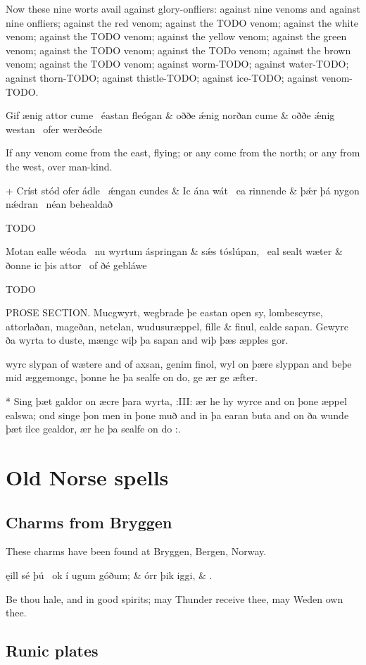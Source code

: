 \bvb Now these nine worts avail against glory-onfliers: against nine venoms and against nine onfliers; against the red venom; against the TODO venom; against the white venom; against the TODO venom; against the yellow venom; against the green venom; against the TODO venom; against the TODo venom; against the brown venom; against the TODO venom; against worm-TODO; against water-TODO; against thorn-TODO; against thistle-TODO; against ice-TODO; against venom-TODO.\evb
\evg


\bvg{}
\bva[0]Gif ænig attor cume \hld\ éastan fleógan &
oððe ǽnig norðan cume &
oððe ǽnig westan \hld\ ofer werðeóde\eva

\bvb If any venom come from the east, flying; or any come from the north; or any from the west, over man-kind.\evb
\evg


\bvg{}
\bva[0]+ Críst stód ofer ádle \hld\ ǽngan cundes &
Ic ána wát \hld\ ea rinnende &
þǽr þá nygon nǽdran \hld\ néan behealdað\eva

\bvb TODO\evb
\evg


\bvg{}
\bva[0]Motan ealle wéoda \hld\ nu wyrtum áspringan &
sǽs tóslúpan, \hld\ eal sealt wæter &
ðonne ic þis attor \hld\ of ðé gebláwe\eva

\bvb TODO\evb
\evg


PROSE SECTION.
Mucgwyrt, wegbrade þe eastan open sy, lombescyrse, attorlaðan, mageðan, netelan, wudusuræppel, fille \& finul, ealde sapan. Gewyrc ða wyrta to duste, mængc wiþ þa sapan and wiþ þæs æpples gor.

wyrc slypan of wætere and of axsan, genim finol, wyl on þære slyppan and beþe mid æggemongc, þonne he þa sealfe on do, ge ær ge æfter.


* Sing þæt galdor on æcre þara wyrta, :III: ær he hy wyrce and on þone æppel ealswa; ond singe þon men in þone muð and in þa earan buta and on ða wunde þæt ilce gealdor, ær he þa sealfe on do :.



\chapter{Old Norse spells}

\section{Charms from Bryggen}

These charms have been found at Bryggen, Bergen, Norway.

\bvg
\bva[B380] ęill sé þú \hld\ ok í ugum góðum; &
\ind {}órr þik iggi, &
\ind {}.\eva

\bvb Be thou hale, and in good spirits; may Thunder receive thee, may Weden own thee.\evb
\evg


\section{Runic plates}
